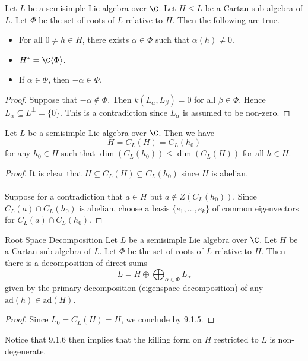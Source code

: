 \documentclass[a4paper]{article}
\begin{document}
\begin{lmm}{}{} Let $L$ be a semisimple Lie algebra over $\C$. Let $H\leq L$ be a Cartan sub-algebra of $L$. Let $\Phi$ be the set of roots of $L$ relative to $H$. Then the following are true. 
\begin{itemize}
\item For all $0\neq h\in H$, there exists $\alpha\in\Phi$ such that $\alpha(h)\neq 0$. 
\item $H^\ast=\C\langle\Phi\rangle$. 
\item If $\alpha\in\Phi$, then $-\alpha\in\Phi$. 
\end{itemize} \tcbline
\begin{proof}
Suppose that $-\alpha\notin\Phi$. Then $k(L_\alpha,L_\beta)=0$ for all $\beta\in\Phi$. Hence $L_\alpha\subseteq L^\perp=\{0\}$. This is a contradiction since $L_\alpha$ is assumed to be non-zero. 
\end{proof}
\end{lmm}

\begin{prp}{}{} Let $L$ be a semisimple Lie algebra over $\C$. Then we have $$H=C_L(H)=C_L(h_0)$$ for any $h_0\in H$ such that $\dim(C_L(h_0))\leq\dim(C_L(H))$ for all $h\in H$. \tcbline
\begin{proof}
It is clear that $H\subseteq C_L(H)\subseteq C_L(h_0)$ since $H$ is abelian. \\~\\

Suppose for a contradiction that $a\in H$ but $a\notin Z(C_L(h_0))$. Since $C_L(a)\cap C_L(h_0)$ is abelian, choose a basis $\{e_1,\dots,e_k\}$ of common eigenvectors for $C_L(a)\cap C_L(h_0)$. 
\end{proof}
\end{prp}

\begin{thm}{Root Space Decomposition}{} Let $L$ be a semisimple Lie algebra over $\C$. Let $H$ be a Cartan sub-algebra of $L$. Let $\Phi$ be the set of roots of $L$ relative to $H$. Then there is a decomposition of direct sums $$L=H\oplus\bigoplus_{\alpha\in\Phi}L_\alpha$$ given by the primary decomposition (eigenspace decomposition) of any $\text{ad}(h)\in\text{ad}(H)$. \tcbline
\begin{proof}
Since $L_0=C_L(H)=H$, we conclude by 9.1.5. 
\end{proof}
\end{thm}

Notice that 9.1.6 then implies that the killing form on $H$ restricted to $L$ is non-degenerate. 
\end{document}
